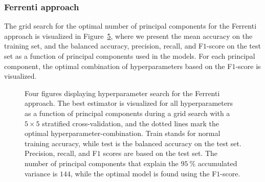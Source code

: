 \documentclass[superscriptaddress,unsortedaddress,
 amsmath,amssymb,
 aps,
]{revtex4-2}
\begin{document}
\subsubsection*{Ferrenti approach}
The grid search for the optimal number of principal components for the Ferrenti approach is visualized in Figure~\ref{fig:01-pca}, where we present the mean accuracy on the training set, and the balanced accuracy, precision, recall, and F$1$-score on the test set as a function of principal components used in the models. For each principal component, the optimal combination of hyperparameters based on the F$1$-score is visualized. 

\begin{figure}[ht!]
\begin{subfigure}[b]{1.0\textwidth}
    \centering
    
  \end{subfigure}
  \par\bigskip
  \begin{subfigure}[b]{0.5\textwidth}
    
    \caption{}
    \label{fig:q1-LOG}
  \end{subfigure}%
    \hfill
  \begin{subfigure}[b]{0.5\textwidth}
    
    \caption{}
    \label{fig:q1-DT}
  \end{subfigure}
  \begin{subfigure}[b]{0.5\textwidth}
    
    \caption{}
    \label{fig:q1-RF}
  \end{subfigure}%
   \hfill
  \begin{subfigure}[b]{0.5\textwidth}
    
    \caption{}
    \label{fig:q1-GB}
  \end{subfigure}
  \caption{Four figures displaying hyperparameter search for the Ferrenti approach. The best estimator is visualized for all hyperparameters as a function of principal components during a grid search with a $5\times5$ stratified cross-validation, and the dotted lines mark the optimal hyperparameter-combination. Train stands for normal training accuracy, while test is the balanced accuracy on the test set. Precision, recall, and F$1$ scores are based on the test set. The number of principal components that explain the $95 \ \%$ accumulated variance is $144$, while the optimal model is found using the F$1$-score.}
  \label{fig:01-pca}
\end{figure}
\end{document}
